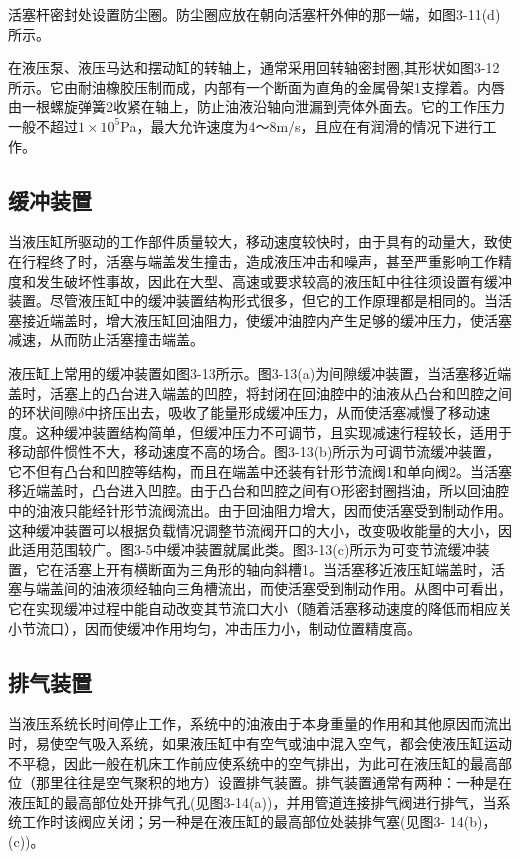 
活塞杆密封处设置防尘圈。防尘圈应放在朝向活塞杆外伸的那一端，如图3-11(d)所示。


在液压泵、液压马达和摆动缸的转轴上，通常采用回转轴密封圈,其形状如图3-12所示。它由耐油橡胶压制而成，内部有一个断面为直角的金属骨架1支撑着。内唇由一根螺旋弹簧2收紧在轴上，防止油液沿轴向泄漏到壳体外面去。它的工作压力一般不超过$1\times10^5$Pa，最大允许速度为4～8m/s，且应在有润滑的情况下进行工作。
\subsection{缓冲装置}
    当液压缸所驱动的工作部件质量较大，移动速度较快时，由于具有的动量大，致使在行程终了时，活塞与端盖发生撞击，造成液压冲击和噪声，甚至严重影响工作精度和发生破坏性事故，因此在大型、高速或要求较高的液压缸中往往须设置有缓冲装置。尽管液压缸中的缓冲装置结构形式很多，但它的工作原理都是相同的。当活塞接近端盖时，增大液压缸回油阻力，使缓冲油腔内产生足够的缓冲压力，使活塞减速，从而防止活塞撞击端盖。

    液压缸上常用的缓冲装置如图3-13所示。图3-13(a)为间隙缓冲装置，当活塞移近端盖时，活塞上的凸台进入端盖的凹腔，将封闭在回油腔中的油液从凸台和凹腔之间的环状间隙$\delta$中挤压出去，吸收了能量形成缓冲压力，从而使活塞减慢了移动速度。这种缓冲装置结构简单，但缓冲压力不可调节，且实现减速行程较长，适用于移动部件惯性不大，移动速度不高的场合。图3-13(b)所示为可调节流缓冲装置，它不但有凸台和凹腔等结构，而且在端盖中还装有针形节流阀1和单向阀2。当活塞移近端盖时，凸台进入凹腔。由于凸台和凹腔之间有O形密封圈挡油，所以回油腔中的油液只能经针形节流阀流出。由于回油阻力增大，因而使活塞受到制动作用。这种缓冲装置可以根据负载情况调整节流阀开口的大小，改变吸收能量的大小，因此适用范围较广。图3-5中缓冲装置就属此类。图3-13(c)所示为可变节流缓冲装置，它在活塞上开有横断面为三角形的轴向斜槽1。当活塞移近液压缸端盖时，活塞与端盖间的油液须经轴向三角槽流出，而使活塞受到制动作用。从图中可看出，它在实现缓冲过程中能自动改变其节流口大小（随着活塞移动速度的降低而相应关小节流口），因而使缓冲作用均匀，冲击压力小，制动位置精度高。
\subsection{排气装置}
    当液压系统长时间停止工作，系统中的油液由于本身重量的作用和其他原因而流出时，易使空气吸入系统，如果液压缸中有空气或油中混入空气，都会使液压缸运动不平稳，因此一般在机床工作前应使系统中的空气排出，为此可在液压缸的最高部位（那里往往是空气聚积的地方）设置排气装置。排气装置通常有两种：一种是在液压缸的最高部位处开排气孔(见图3-14(a))，并用管道连接排气阀进行排气，当系统工作时该阀应关闭；另一种是在液压缸的最高部位处装排气塞(见图3- 14(b)，(c))。
